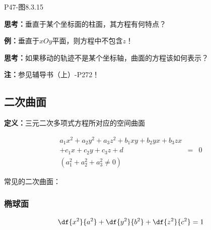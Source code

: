 \begin{center}
	
	P47-图8.3.15
\end{center}

{\bf 思考：}垂直于某个坐标面的柱面，其方程有何特点？

{\bf 例：}垂直于$xOy$平面，则方程中不包含$z$！

{\bf 思考：}如果移动的轨迹不是某个坐标轴，曲面的方程该如何表示？

{\bf 注：}参见辅导书（上）-P272！

\subsection{二次曲面}

{\bf 定义：}三元二次多项式方程所对应的空间曲面

\begin{eqnarray*}
	a_1x^2+a_2y^2+a_3z^2+b_1xy+b_2yx+b_3zx& &\\
	+c_1x+c_2y+c_3z+d & = & 0\\
	(a_1^2+a_2^2+a_3^2\ne 0)& &
\end{eqnarray*}

常见的二次曲面：

\subsubsection{椭球面}

$${\df{x^2}{a^2}+\df{y^2}{b^2}+\df{z^2}{c^2}=1}$$

\begin{center}
\end{center}

